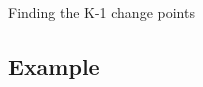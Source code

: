 \begin{frame}[fragile]{Finding the K-1 change points}
% 
% 
% 
% 
% 
\end{frame}


\subsection*{Example}
